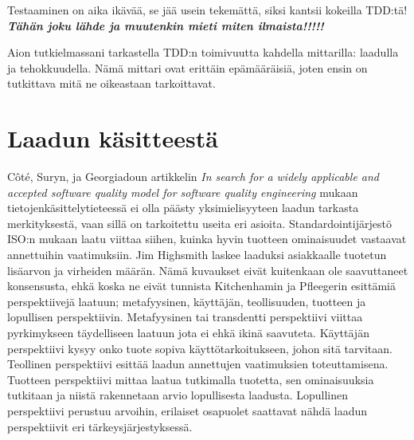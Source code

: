 \documentclass[finnish]{tktltiki2}
\theoremstyle{definition}
\theoremstyle{remark}
\begin{document}
Testaaminen on aika ikävää, se jää usein tekemättä, siksi kantsii kokeilla TDD:tä! \textbf{\textit{Tähän joku lähde ja muutenkin mieti miten ilmaista!!!!!}}

Aion tutkielmassani tarkastella TDD:n toimivuutta kahdella mittarilla: laadulla ja tehokkuudella. Nämä mittari ovat erittäin epämääräisiä, joten ensin on tutkittava mitä ne oikeastaan tarkoittavat.


\section{Laadun käsitteestä}




Côté,  Suryn, ja Georgiadoun artikkelin \emph{In search for a widely applicable and accepted software quality model for software quality engineering}  mukaan tietojenkäsittelytieteessä ei olla päästy yksimielisyyteen laadun tarkasta merkityksestä, vaan sillä on tarkoitettu useita eri asioita. Standardointijärjestö ISO:n mukaan laatu viittaa siihen, kuinka hyvin tuotteen ominaisuudet vastaavat annettuihin vaatimuksiin. Jim Highsmith laskee laaduksi asiakkaalle tuotetun lisäarvon %
 ja virheiden määrän. Nämä kuvaukset eivät kuitenkaan ole saavuttaneet konsensusta, ehkä koska ne eivät tunnista Kitchenhamin ja Pfleegerin esittämiä perspektiivejä laatuun; metafyysinen, käyttäjän, teollisuuden, tuotteen ja lopullisen perspektiivin. Metafyysinen tai transdentti perspektiivi viittaa pyrkimykseen täydelliseen laatuun jota ei ehkä ikinä saavuteta. Käyttäjän perspektiivi kysyy onko tuote sopiva käyttötarkoitukseen, johon sitä tarvitaan. Teollinen perspektiivi esittää laadun annettujen vaatimuksien toteuttamisena. Tuotteen perspektiivi mittaa laatua tutkimalla tuotetta, sen ominaisuuksia tutkitaan ja niistä rakennetaan arvio lopullisesta laadusta. Lopullinen perspektiivi perustuu arvoihin, erilaiset osapuolet saattavat nähdä laadun perspektiivit eri tärkeysjärjestyksessä. \cite{Cote07}


\end{document}
